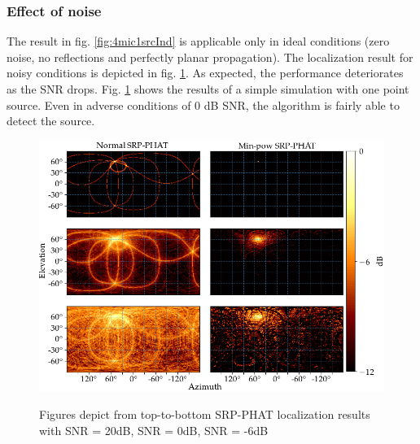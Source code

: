 \subsubsection{Effect of noise}
The result in fig. \ref{fig:4mic1srcInd} is applicable only in ideal conditions (zero noise, no reflections and perfectly planar propagation). The localization result for noisy conditions is depicted in fig. \ref{fig:4mic1srcNoisy}. As expected, the performance deteriorates as the SNR drops. Fig. \ref{fig:4mic1srcNoisy} shows the results of a simple simulation with one point source. Even in adverse conditions of 0 dB SNR, the algorithm is fairly able to detect the source.
\begin{figure}[H]
\centering
\includegraphics[width=\textwidth]{Figures/noiseSim.png}
\label{fig:4mic1srcNoisy}
\caption{Figures depict from top-to-bottom SRP-PHAT localization results with SNR = 20dB, SNR = 0dB, SNR = -6dB}
\label{fig:4mic1srcNoisy}
\end{figure}

